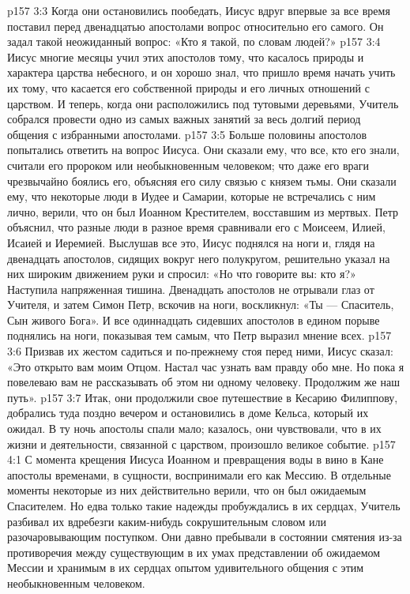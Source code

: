 \vs p157 3:3 Когда они остановились пообедать, Иисус вдруг впервые за все время поставил перед двенадцатью апостолами вопрос относительно его самого. Он задал такой неожиданный вопрос: «Кто я такой, по словам людей?»
\vs p157 3:4 \pc Иисус многие месяцы учил этих апостолов тому, что касалось природы и характера царства небесного, и он хорошо знал, что пришло время начать учить их тому, что касается его собственной природы и его личных отношений с царством. И теперь, когда они расположились под тутовыми деревьями, Учитель собрался провести одно из самых важных занятий за весь долгий период общения с избранными апостолами.
\vs p157 3:5 \pc Больше половины апостолов попытались ответить на вопрос Иисуса. Они сказали ему, что все, кто его знали, считали его пророком или необыкновенным человеком; что даже его враги чрезвычайно боялись его, объясняя его силу связью с князем тьмы. Они сказали ему, что некоторые люди в Иудее и Самарии, которые не встречались с ним лично, верили, что он был Иоанном Крестителем, восставшим из мертвых. Петр объяснил, что разные люди в разное время сравнивали его с Моисеем, Илией, Исаией и Иеремией. Выслушав все это, Иисус поднялся на ноги и, глядя на двенадцать апостолов, сидящих вокруг него полукругом, решительно указал на них широким движением руки и спросил: «Но что говорите вы: кто я?» Наступила напряженная тишина. Двенадцать апостолов не отрывали глаз от Учителя, и затем Симон Петр, вскочив на ноги, воскликнул: «Ты --- Спаситель, Сын живого Бога». И все одиннадцать сидевших апостолов в едином порыве поднялись на ноги, показывая тем самым, что Петр выразил мнение всех.
\vs p157 3:6 Призвав их жестом садиться и по\hyp{}прежнему стоя перед ними, Иисус сказал: «Это открыто вам моим Отцом. Настал час узнать вам правду обо мне. Но пока я повелеваю вам не рассказывать об этом ни одному человеку. Продолжим же наш путь».
\vs p157 3:7 Итак, они продолжили свое путешествие в Кесарию Филиппову, добрались туда поздно вечером и остановились в доме Кельса, который их ожидал. В ту ночь апостолы спали мало; казалось, они чувствовали, что в их жизни и деятельности, связанной с царством, произошло великое событие.
\vs p157 4:1 С момента крещения Иисуса Иоанном и превращения воды в вино в Кане апостолы временами, в сущности, воспринимали его как Мессию. В отдельные моменты некоторые из них действительно верили, что он был ожидаемым Спасителем. Но едва только такие надежды пробуждались в их сердцах, Учитель разбивал их вдребезги каким\hyp{}нибудь сокрушительным словом или разочаровывающим поступком. Они давно пребывали в состоянии смятения из\hyp{}за противоречия между существующим в их умах представлении об ожидаемом Мессии и хранимым в их сердцах опытом удивительного общения с этим необыкновенным человеком.
